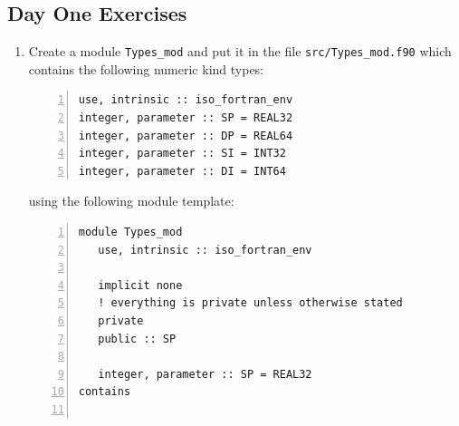 \documentclass[12pt]{article}
\begin{document}
\subsection*{Day One Exercises}
\setdefaultleftmargin{0pt}{}{}{}{}{}
\begin{enumerate}
\item Create a module \texttt{Types\_mod} and put it in the file \texttt{src/Types\_mod.f90} which 
contains the following numeric kind types:
\begin{lstlisting}[numbers=left,numberstyle=\footnotesize\color{gray},caption={Kind parameters},captionpos=b,showstringspaces=false,label={kind:params},columns=fullflexible,basicstyle=\ttfamily,keywordstyle=\color{blue}\ttfamily,stringstyle=\color{red}\ttfamily,commentstyle=\color{green}\ttfamily,language={[08]Fortran},escapechar=|]
use, intrinsic :: iso_fortran_env
integer, parameter :: SP = REAL32
integer, parameter :: DP = REAL64
integer, parameter :: SI = INT32
integer, parameter :: DI = INT64
\end{lstlisting}
using the following module template: 
\begin{lstlisting}[numbers=left,numberstyle=\footnotesize\color{gray},caption={Module template},captionpos=b,showstringspaces=false,label={mod:template},columns=fullflexible,basicstyle=\ttfamily,keywordstyle=\color{blue}\ttfamily,stringstyle=\color{red}\ttfamily,commentstyle=\color{green}\ttfamily,language={[08]Fortran},escapechar=|]
module Types_mod
   use, intrinsic :: iso_fortran_env

   implicit none
   ! everything is private unless otherwise stated
   private 
   public :: SP

   integer, parameter :: SP = REAL32
contains


\end{lstlisting}
\end{enumerate}
\end{document}
